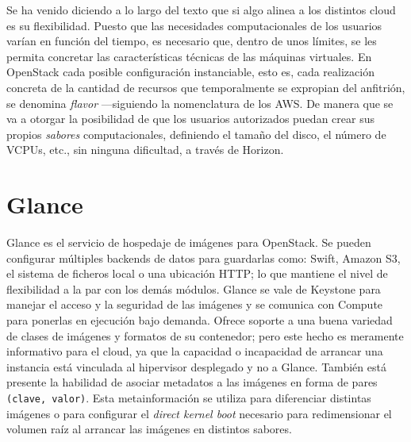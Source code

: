 Se ha venido diciendo a lo largo del texto que si algo alinea a los distintos cloud es su flexibilidad. Puesto que las necesidades computacionales de los usuarios var\'ian en funci\'on del tiempo, es necesario que, dentro de unos l\'imites, se les permita concretar las caracter\'isticas t\'ecnicas de las m\'aquinas virtuales. En OpenStack cada posible configuraci\'on instanciable, esto es, cada realizaci\'on concreta de la cantidad de recursos que temporalmente se expropian del anfitri\'on, se denomina \emph{flavor} ---siguiendo la nomenclatura de los AWS. De manera que se va a otorgar la posibilidad de que los usuarios autorizados puedan crear sus propios \emph{sabores} computacionales, definiendo el tama\~no del disco, el n\'umero de VCPUs, etc., sin ninguna dificultad, a trav\'es de Horizon.


\section{Glance}\label{sec:glance}
\noindent Glance es el servicio de hospedaje de im\'agenes para OpenStack. Se pueden configurar m\'ultiples backends de datos para guardarlas como: Swift, Amazon S3, el sistema de ficheros local o una ubicaci\'on HTTP; lo que mantiene el nivel de flexibilidad a la par con los dem\'as m\'odulos. Glance se vale de Keystone para manejar el acceso y la seguridad de las im\'agenes y se comunica con Compute para ponerlas en ejecuci\'on bajo demanda.
Ofrece soporte a una buena variedad de clases de im\'agenes y formatos de su contenedor; pero este hecho es meramente informativo para el cloud, ya que la capacidad o incapacidad de arrancar una instancia est\'a vinculada al hipervisor desplegado y no a Glance. Tambi\'en est\'a presente la habilidad de asociar metadatos a las im\'agenes en forma de pares \texttt{(clave, valor)}. Esta metainformaci\'on se utiliza para diferenciar distintas im\'agenes o para configurar el \emph{direct kernel boot} necesario para redimensionar el volumen ra\'iz al arrancar las im\'agenes en distintos sabores.


